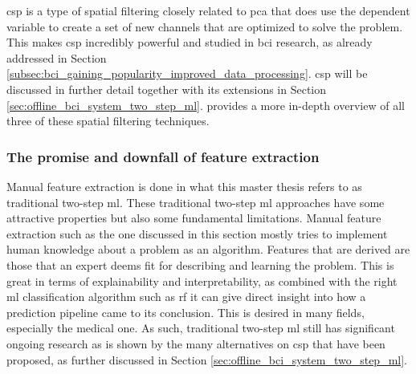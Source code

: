 \Gls{csp} is a type of spatial filtering closely related to \gls{pca} that does use the dependent variable to create a set of new channels that are optimized to solve the problem.
This makes \gls{csp} incredibly powerful and studied in \gls{bci} research, as already addressed in Section \ref{subsec:bci_gaining_popularity_improved_data_processing}.
\Gls{csp} will be discussed in further detail together with its extensions in Section \ref{sec:offline_bci_system_two_step_ml}.
 provides a more in-depth overview of all three of these spatial filtering techniques.


\subsubsection{The promise and downfall of feature extraction}
\label{subsubsec:processing_signals_general_pipeline_features_dl_link}

Manual feature extraction is done in what this master thesis refers to as traditional two-step \gls{ml}. 
These traditional two-step \gls{ml} approaches have some attractive properties but also some fundamental limitations.
Manual feature extraction such as the one discussed in this section mostly tries to implement human knowledge about a problem as an algorithm.
Features that are derived are those that an expert deems fit for describing and learning the problem.
This is great in terms of explainability and interpretability, as combined with the right \gls{ml} classification algorithm such as \gls{rf} it can give direct insight into how a prediction pipeline came to its conclusion.
This is desired in many fields, especially the medical one.
As such, traditional two-step \gls{ml} still has significant ongoing research as is shown by the many alternatives on \gls{csp} that have been proposed, as further discussed in Section \ref{sec:offline_bci_system_two_step_ml}.

